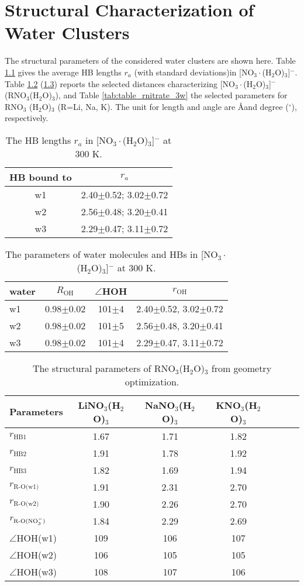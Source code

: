 \chapter{Structural Characterization of Water Clusters}\label{structure_of_clusters}
The structural parameters of the considered water clusters are shown here.
Table \ref{tab:3_nitrate_bond} gives the average HB lengths $r_a$ (with standard deviations)in [NO$_3\cdot$(H$_2$O)$_3$]$^-$.  
Table \ref{tab:3w_nitrate} (\ref{tab:table_geo_opt}) reports the selected distances characterizing 
[NO$_3\cdot$(H$_2$O)$_3$]$^-$ (RNO$_3$(H$_2$O)$_3$), and Table \ref{tab:table_rnitrate_3w} the selected parameters for RNO$_3$   
 (H$_2$O)$_3$ (R=Li, Na, K).
The unit for length and angle are \AA and degree ($^\circ$), respectively.
% 
\begin{table}[!h]
\centering
\caption{\label{tab:3_nitrate_bond}%
The HB lengths $r_a$ in [NO$_3\cdot$(H$_2$O)$_3$]$^-$ at 300 K.} 
\begin{tabular}{cc} \\\toprule
 HB bound to & \multicolumn{1}{c}{ $r_a$} \\
\hline
 w1 &2.40$\pm$0.52; 3.02$\pm$0.72 \\
 w2 &2.56$\pm$0.48; 3.20$\pm$0.41 \\
 w3 &2.29$\pm$0.47; 3.11$\pm$0.72
\end{tabular}
\end{table}
%
\begin{table}[!htbp]
\centering
\caption{\label{tab:3w_nitrate}%
The parameters of water molecules and HBs in [NO$_3\cdot$(H$_2$O)$_3$]$^-$ at 300 K.}
\begin{tabular}{lccc}
water &$R_\text{OH}$ &$\angle$HOH & $r_\text{OH}$ \\
\hline
w1 &0.98$\pm$0.02 &101$\pm$4 & 2.40$\pm$0.52, 3.02$\pm$0.72 \\
w2 &0.98$\pm$0.02 &101$\pm$5 & 2.56$\pm$0.48, 3.20$\pm$0.41 \\
w3 &0.98$\pm$0.02 &101$\pm$4 & 2.29$\pm$0.47, 3.11$\pm$0.72
\end{tabular}
\end{table}
%
\begin{table}[!htbp]
\centering
\caption{\label{tab:table_geo_opt}%
  The structural parameters of RNO$_3$(H$_2$O)$_3$ from geometry optimization.} 
\begin{tabular}{l*{4}ccc}
Parameters  & LiNO$_3$(H$_2$O)$_3$& NaNO$_3$(H$_2$O)$_3$ & KNO$_3$(H$_2$O)$_3$\\
\hline
$r_\text{HB1}$& 1.67 & 1.71 & 1.82 \\
$r_\text{HB2}$& 1.91 & 1.78 & 1.92\\
$r_\text{HB3}$& 1.82 & 1.69 & 1.94\\
$r_\text{R-O(w1)}$ & 1.91 & 2.31 & 2.70\\
$r_\text{R-O(w2)}$ & 1.90 & 2.26 & 2.70\\
$r_\text{R-O(NO$_3^-$)}$ & 1.84 & 2.29 & 2.69 \\
$\angle$HOH(w1)& 109 & 106 &107 \\
$\angle$HOH(w2)& 106 & 105&105 \\
$\angle$HOH(w3)& 108 & 107 &106
\end{tabular}
\end{table}
